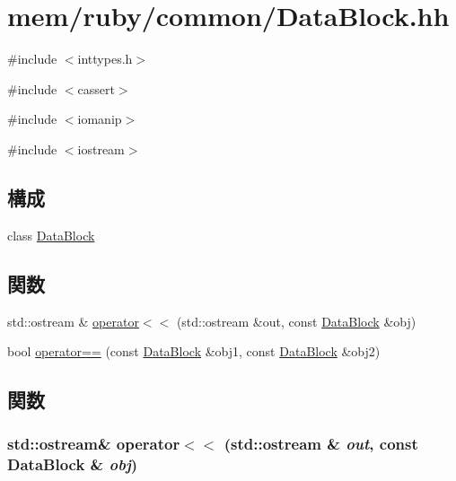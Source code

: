 \hypertarget{DataBlock_8hh}{
\section{mem/ruby/common/DataBlock.hh}
\label{DataBlock_8hh}
}
{\ttfamily \#include $<$inttypes.h$>$}\par
{\ttfamily \#include $<$cassert$>$}\par
{\ttfamily \#include $<$iomanip$>$}\par
{\ttfamily \#include $<$iostream$>$}\par
\subsection*{構成}
\begin{DoxyCompactItemize}
\item 
class \hyperlink{classDataBlock}{DataBlock}
\end{DoxyCompactItemize}
\subsection*{関数}
\begin{DoxyCompactItemize}
\item 
std::ostream \& \hyperlink{DataBlock_8hh_ac0e5916765d621fc50709fc42571f855}{operator$<$$<$} (std::ostream \&out, const \hyperlink{classDataBlock}{DataBlock} \&obj)
\item 
bool \hyperlink{DataBlock_8hh_af75f4dd45886bfab23035bbbd4922c83}{operator==} (const \hyperlink{classDataBlock}{DataBlock} \&obj1, const \hyperlink{classDataBlock}{DataBlock} \&obj2)
\end{DoxyCompactItemize}


\subsection{関数}
\hypertarget{DataBlock_8hh_ac0e5916765d621fc50709fc42571f855}{
\subsubsection[{operator$<$$<$}]{\setlength{\rightskip}{0pt plus 5cm}std::ostream\& operator$<$$<$ (std::ostream \& {\em out}, \/  const {\bf DataBlock} \& {\em obj})}}
\label{DataBlock_8hh_ac0e5916765d621fc50709fc42571f855}



